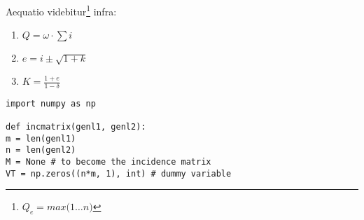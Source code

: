 %
%

\lipsum[11]


	\lipsum[2]
	
	
	\newp Aequatio videbitur\footnote{ $Q_e = max\big(1 \dots n\big)$} infra:
	
	

	\lipsum[4]

	\begin{enumerate}
		\item {$Q = \omega \cdot \sum i$}
		\item {$e = i \pm \sqrt{1+k}$}
		\item {$K = \frac{1 + e}{1 - \delta}$}
	\end{enumerate}


	\lipsum[15] \newp

\begin{lstlisting}[style=Python]
import numpy as np

def incmatrix(genl1, genl2):
m = len(genl1)
n = len(genl2)
M = None # to become the incidence matrix
VT = np.zeros((n*m, 1), int) # dummy variable
\end{lstlisting}
